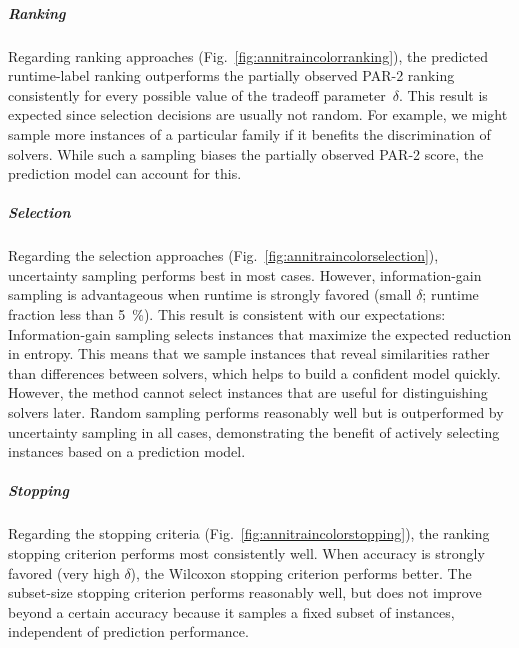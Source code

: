 \documentclass[sn-basic, Numbered]{sn-jnl} %
\begin{document}
\subparagraph{Ranking}

Regarding ranking approaches (Fig.~\ref{fig:annitraincolorranking}), the predicted runtime-label ranking outperforms the partially observed PAR-2 ranking consistently for every possible value of the tradeoff parameter~$\delta$.
This result is expected since selection decisions are usually not random.
For example, we might sample more instances of a particular family if it benefits the discrimination of solvers.
While such a sampling biases the partially observed PAR-2 score, the prediction model can account for this.

\subparagraph{Selection}

Regarding the selection approaches (Fig.~\ref{fig:annitraincolorselection}), uncertainty sampling performs best in most cases.
However, information-gain sampling is advantageous when runtime is strongly favored (small $\delta$; runtime fraction less than \SI{5}{\%}).
This result is consistent with our expectations:
Information-gain sampling selects instances that maximize the expected reduction in entropy.
This means that we sample instances that reveal similarities rather than differences between solvers, which helps to build a confident model quickly.
However, the method cannot select instances that are useful for distinguishing solvers later.
Random sampling performs reasonably well but is outperformed by uncertainty sampling in all cases, demonstrating the benefit of actively selecting instances based on a prediction model.

\subparagraph{Stopping}

Regarding the stopping criteria (Fig.~\ref{fig:annitraincolorstopping}), the ranking stopping criterion performs most consistently well.
When accuracy is strongly favored (very high $\delta$), the Wilcoxon stopping criterion performs better.
The subset-size stopping criterion performs reasonably well, but does not improve beyond a certain accuracy because it samples a fixed subset of instances, independent of prediction performance.
\end{document}
